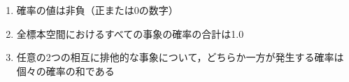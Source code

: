 \begin{enumerate}
	\item 確率の値は非負（正または0の数字）
	\item 全標本空間におけるすべての事象の確率の合計は1.0
	\item 任意の2つの相互に排他的な事象について，どちらか一方が発生する確率は個々の確率の和である
\end{enumerate}
